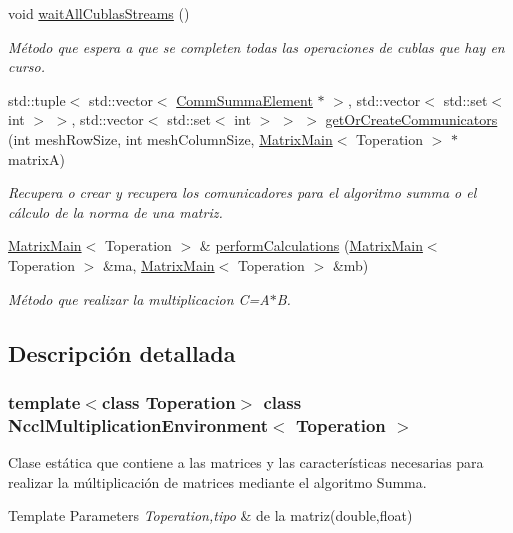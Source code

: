 \begin{DoxyCompactItemize}
void \hyperlink{classNcclMultiplicationEnvironment_a06940393e09861d1043800a8beead346}{wait\+All\+Cublas\+Streams} ()
\begin{DoxyCompactList}\small\item\em Método que espera a que se completen todas las operaciones de cublas que hay en curso. \end{DoxyCompactList}\item 
std\+::tuple$<$ std\+::vector$<$ \hyperlink{classCommSummaElement}{Comm\+Summa\+Element} $\ast$ $>$, std\+::vector$<$ std\+::set$<$ int $>$ $>$, std\+::vector$<$ std\+::set$<$ int $>$ $>$ $>$ \hyperlink{classNcclMultiplicationEnvironment_a416a457b998aa7304d80dfede63ccbad}{get\+Or\+Create\+Communicators} (int mesh\+Row\+Size, int mesh\+Column\+Size, \hyperlink{classMatrixMain}{Matrix\+Main}$<$ Toperation $>$ $\ast$matrixA)
\begin{DoxyCompactList}\small\item\em Recupera o crear y recupera los comunicadores para el algoritmo summa o el cálculo de la norma de una matriz. \end{DoxyCompactList}\item 
\hyperlink{classMatrixMain}{Matrix\+Main}$<$ Toperation $>$ \& \hyperlink{classNcclMultiplicationEnvironment_ab849bd06509a70660a2e8e161b576397}{perform\+Calculations} (\hyperlink{classMatrixMain}{Matrix\+Main}$<$ Toperation $>$ \&ma, \hyperlink{classMatrixMain}{Matrix\+Main}$<$ Toperation $>$ \&mb)
\begin{DoxyCompactList}\small\item\em Método que realizar la multiplicacion C=A$\ast$B. \end{DoxyCompactList}\end{DoxyCompactItemize}


\subsection{Descripción detallada}
\subsubsection*{template$<$class Toperation$>$\newline
class Nccl\+Multiplication\+Environment$<$ Toperation $>$}

Clase estática que contiene a las matrices y las características necesarias para realizar la múltiplicación de matrices mediante el algoritmo Summa. 


\begin{DoxyTemplParams}{Template Parameters}
{\em Toperation,tipo} & de la matriz(double,float) \\
\hline
\end{DoxyTemplParams}


